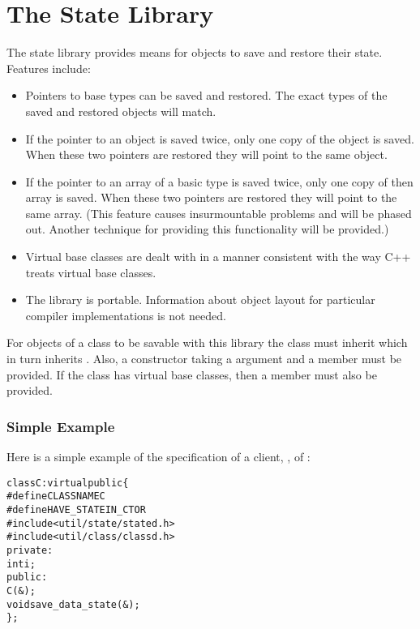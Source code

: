 
\chapter{The State Library}

The state library provides means for objects to save and restore their
state.  Features include:

\begin{itemize}
\item
  Pointers to base types can be saved and restored.
  The exact types of the saved and restored objects will match.
\item
  If the pointer to an object is saved twice, only one copy of the
  object is saved.  When these two pointers are restored they will
  point to the same object.
\item
  If the pointer to an array of a basic type is saved twice,
  only one copy of then
  array is saved.  When these two pointers are restored they will
  point to the same array.  (This feature causes insurmountable
  problems and will be phased out.  Another technique for providing this
  functionality will be provided.)
\item
  Virtual base classes are dealt with in a manner consistent with
  the way C++ treats virtual base classes.
\item
  The library is portable.  Information about object layout for
  particular compiler implementations is not needed.
\end{itemize}

For objects of a class to be savable with this library the class must
inherit  which in turn inherits
.  Also, a constructor taking a
\srccd{\&} argument and a
 member must be provided.  If
the class has virtual base classes, then a
 member must also be
provided.



\subsection{Simple Example}

Here is a simple example of the specification of a client, ,
of :
\begin{alltt}
class C: virtual public  \{
# define CLASSNAME C
# define HAVE_STATEIN_CTOR
# include <util/state/stated.h>
# include <util/class/classd.h>
  private:
    int i;
  public:
    C(&);
    void save_data_state(&);
  \};
\end{alltt}

